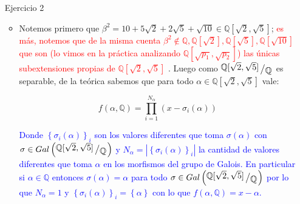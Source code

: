 \documentclass[11pt]{article}
\newcommand{\Q}{\mathbb{Q}}
\newcommand{\abs}[1]{\left\lvert#1\right\rvert}
\newcommand{\sett}[1]{\left\lbrace#1\right\rbrace}
\newcommand{\quotient}[2]{{\raisebox{.2em}{$#1$}\left/\raisebox{-.2em}{$#2$}\right.}}
\numberwithin{theorem}{subsection}
\newcommand{\qed}{\nobreak \ifvmode \relax \else
	\ifdim\lastskip<1.5em \hskip-\lastskip
	\hskip1.5em plus0em minus0.5em \fi \nobreak
	\vrule height0.75em width0.5em depth0.25em\fi}
\begin{document}
\begin{enumerate}
\begin{itemize}
	\begin{equation*}
		\begin{aligned}
			\dfrac{\left(t^{37^2} - t\right)^{38}}{\left(t^{37} - t\right)^{37^2 + 1}} = & \dfrac{t^{q+1}\left(t^{q^2 -1} - 1\right)^{q+1}}{t^{q^2 + 1}\left(t^{q-1} - 1\right)^{q^2 + 1}} \\
			= & \dfrac{\left( \left(t^{q -1} \right)^{q+1} - 1\right)^{q+1}}{t^{q^2 - q} \left(t^{q-1} - 1\right)^{q^2 + 1}} \\
			= & \dfrac{\left( \left(t^{q -1} \right) - 1\right)^{q+1} \left(\sum\limits_{r=0}^{q}{t^{(q-1)r}}\right)^{q+1}}{t^{q^2 - q} \left(t^{q-1} - 1\right)^{q^2 + 1}}  \\
			= & \dfrac{\left(\sum\limits_{r=0}^{q}{t^{(q-1)r}}\right)^{q+1}}{t^{q^2 - q} \left(t^{q-1} - 1\right)^{q^2 -q}}  \\
			= & \frac{g}{h} \qquad \text{pues } (g,h) = 1
		\end{aligned}
	\end{equation*}
	
	Y finalmente $\max \left\lbrace gr(g), gr(h) \right\rbrace = \max \sett{\underbrace{q^2 - q + \left(q-1\right)\left(q^2 - q\right)}_{q^3 - q^2}, \underbrace{(q-1)q(q+1)}_{q^3 - q}} = q^3 - q$, luego conlcuimos que $E^G = \mathbb{F}_{37}(f)$. \qed
	
	\end{itemize}
	
	\item[Ejercicio 2] 
	
	\begin{itemize}
		\item Notemos primero que $\beta^2 = 10 + 5\sqrt{2} + 2\sqrt{5} + \sqrt{10} \in \Q[\sqrt{2}, \sqrt{5 }]$; \textcolor{red}{
			 es m\'as, notemos que de la misma cuenta $\beta^2 \not\in  \Q,  \Q[\sqrt{2}],  \Q[\sqrt{5 }], \Q[\sqrt{10}]$ que son (lo vimos en la pr\'actica analizando $\Q[\sqrt{p_1}, \sqrt{p_2}]$) las \'unicas subextensiones propias de $\Q[\sqrt{2}, \sqrt{5}]$ 
		 }. Luego como $\quotient{\Q[\sqrt{2}, \sqrt{5 }]}{\Q}$ es separable, de la te\'orica sabemos que para todo $\alpha \in \Q[\sqrt{2}, \sqrt{5 }]$ vale:
		
		\begin{equation*}
			f \left(\alpha, \Q\right) = \prod\limits_{i=1}^{N_{\alpha}} \left(x - \sigma_i(\alpha)\right)
		\end{equation*}
		
		\textcolor{blue}{Donde $\sett{\sigma_i(\alpha)}_i$ son los valores diferentes que toma $\sigma(\alpha)$ con  $\sigma \in Gal \left(\quotient{\Q[\sqrt{2}, \sqrt{5 }]}{\Q}\right)$ y $N_{\alpha} = \abs{\sett{\sigma_i(\alpha)}_i}$ la cantidad de valores diferentes que toma $\alpha$ en los morfismos del grupo de Galois. En particular si $\alpha \in \Q$ entonces $\sigma(\alpha) = \alpha$ para todo $\sigma \in Gal \left(\quotient{\Q[\sqrt{2}, \sqrt{5 }]}{\Q}\right)$ por lo que $N_{\alpha} = 1$ y $\sett{\sigma_i(\alpha)}_i = \sett{\alpha}$ con lo que $f \left(\alpha, \Q\right) = x-\alpha$.}
		

\end{itemize}
\end{enumerate}
\end{document}
